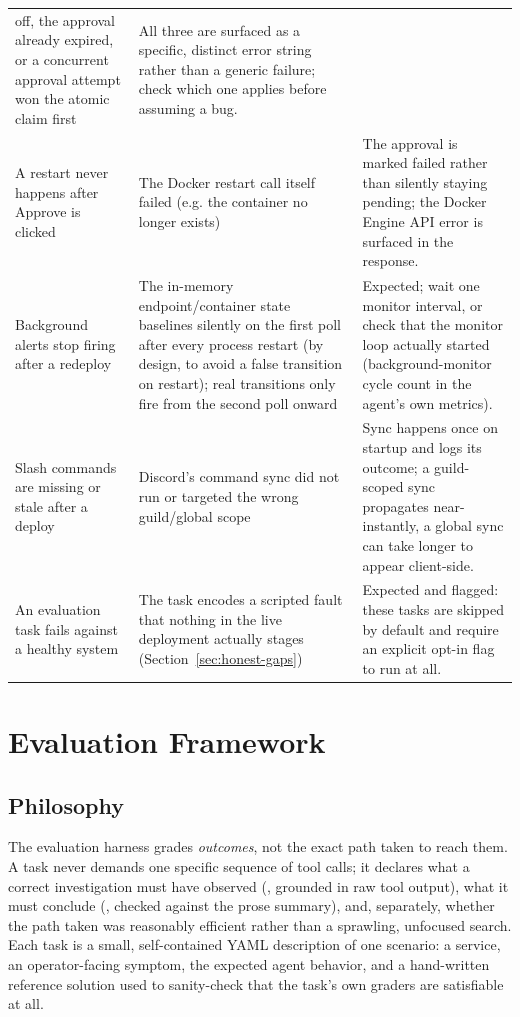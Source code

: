 \documentclass[11pt]{article}
\begin{document}
\begin{longtable}{L{4.1cm} L{4.5cm} L{5.4cm}}
  off, the approval already expired, or a concurrent approval attempt won
  the atomic claim first & All three are surfaced as a specific, distinct
  error string rather than a generic failure; check which one applies
  before assuming a bug. \\
A restart never happens after
Approve is clicked & The Docker restart call itself failed (e.g. the
  container no longer exists) & The approval is marked failed rather than
  silently staying pending; the Docker Engine API error is surfaced in the
  response. \\
Background alerts stop firing
after a redeploy & The in-memory endpoint/container state baselines silently
  on the first poll after every process restart (by design, to avoid a
  false transition on restart); real transitions only fire from the second
  poll onward & Expected; wait one monitor interval, or check that the
  monitor loop actually started (background-monitor cycle count in the
  agent's own metrics). \\
Slash commands are missing or
stale after a deploy & Discord's command sync did not run or targeted the
  wrong guild/global scope & Sync happens once on startup and logs its
  outcome; a guild-scoped sync propagates near-instantly, a global sync can
  take longer to appear client-side. \\
An evaluation task fails against
a healthy system & The task encodes a scripted fault that nothing in the
  live deployment actually stages (Section~\ref{sec:honest-gaps}) & Expected
  and flagged: these tasks are skipped by default and require an explicit
  opt-in flag to run at all. \\
\bottomrule
\end{longtable}

\section{Evaluation Framework}
\label{sec:evals}

\subsection{Philosophy}

The evaluation harness grades \emph{outcomes}, not the exact path taken to
reach them. A task never demands one specific sequence of tool calls; it
declares what a correct investigation must have observed
(\texttt{}, grounded in raw tool output), what it must
conclude (\texttt{}, checked against the prose summary),
and, separately, whether the path taken was reasonably efficient rather
than a sprawling, unfocused search. Each task is a small, self-contained
YAML description of one scenario: a service, an operator-facing symptom, the
expected agent behavior, and a hand-written reference solution used to
sanity-check that the task's own graders are satisfiable at all.
\end{document}
